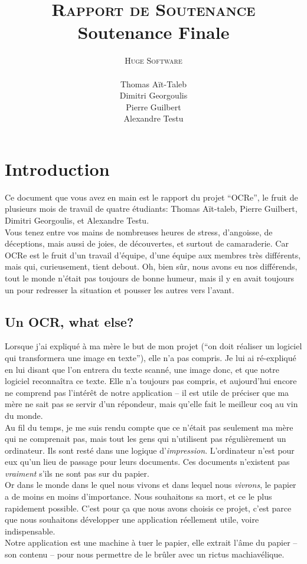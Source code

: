 \documentclass[a4paper,10pt]{report}
\title{\textsc{Rapport de Soutenance} \\ Soutenance Finale}
\author{\textsc{Huge Software}\\ \\ Thomas A\"it-Taleb \\ Dimitri Georgoulis \\ Pierre Guilbert \\ Alexandre Testu}
\date{}
\begin{document}
\lstset{language=C}
\dominitoc
\maketitle
\tableofcontents \pagebreak
\thispagestyle{fancy}

\chapter{Introduction} %
\label{cha:introduction}

Ce document que vous avez en main est le rapport du projet ``OCRe'', le fruit de plusieurs mois de travail de quatre étudiants: Thomas Aït-taleb, Pierre Guilbert, Dimitri Georgoulis, et Alexandre Testu. \\
Vous tenez entre vos mains de nombreuses heures de stress, d’angoisse, de déceptions, mais aussi de joies, de découvertes, et surtout de camaraderie. Car OCRe est le fruit d’un travail d’équipe, d’une équipe aux membres très différents, mais qui, curieusement, tient debout. Oh, bien sûr, nous avons eu nos différends, tout le monde n’était pas toujours de bonne humeur, mais il y en avait toujours un pour redresser la situation et pousser les autres vers l’avant.


\section{Un OCR, what else?} %
\label{sec:un_ocr_what_else_}
Lorsque j’ai expliqué à ma mère le but de mon projet (``on doit réaliser un logiciel qui transformera une image en texte''), elle n’a pas compris. Je lui ai ré-expliqué en lui disant que l’on entrera du texte scanné, une image donc, et que notre logiciel reconnaîtra ce texte. Elle n’a toujours pas compris, et aujourd’hui encore ne comprend pas l’intérêt de notre application – il est utile de préciser que ma mère ne sait pas se servir d’un répondeur, mais qu’elle fait le meilleur coq au vin du monde. \\
Au fil du temps, je me suis rendu compte que ce n’était pas seulement ma mère qui ne comprenait pas, mais tout les gens qui n’utilisent pas régulièrement un ordinateur. Ils sont resté dans une logique d’\emph{impression}. L’ordinateur n’est pour eux qu’un lieu de passage pour leurs documents. Ces documents n’existent pas \emph{vraiment} s’ils ne sont pas sur du papier. \\
Or dans le monde dans le quel nous vivons et dans lequel nous \emph{vivrons}, le papier a de moins en moins d’importance. Nous souhaitons sa mort, et ce le plus rapidement possible. C’est pour ça que nous avons choisis ce projet, c’est parce que nous souhaitons développer une application réellement utile, voire indispensable. \\
Notre application est une machine à tuer le papier, elle extrait l’âme du papier – son contenu – pour nous permettre de le brûler avec un rictus machiavélique. \\
\end{document}
